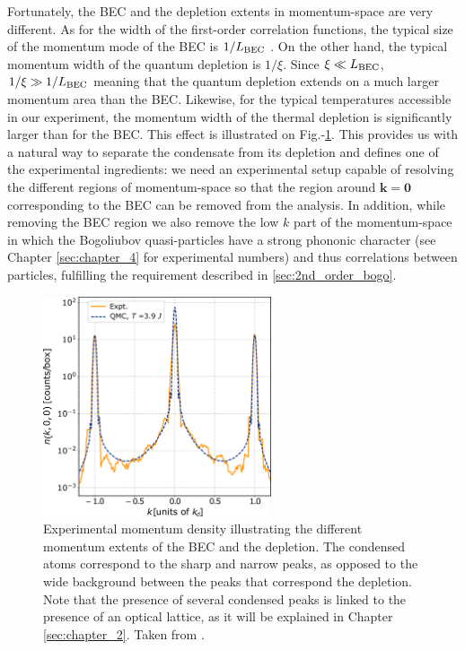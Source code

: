 Fortunately, the BEC and the depletion extents in momentum-space are very different. As for the width of the first-order correlation functions, the typical size of the momentum mode of the BEC is $1/L_{\rm{BEC}}$ \cite{stenger1999}. On the other hand, the typical momentum width of the quantum depletion is $1/\xi$. Since $\xi \ll L_{\rm{BEC}}$, $1/\xi \gg 1/L_{\rm{BEC}}$ meaning that the quantum depletion extends on a much larger momentum area than the BEC. Likewise, for the typical temperatures accessible in our experiment, the momentum width of the thermal depletion is significantly larger than for the BEC.
This effect is illustrated on Fig.-\ref{fig:density_lattice_ch1}. This provides us with a natural way to separate the condensate from its depletion and defines one of the experimental ingredients: we need an experimental setup capable of resolving the different regions of momentum-space so that the region around $\bm{k}=\bm{0}$ corresponding to the BEC can be removed from the analysis. In addition, while removing the BEC region we also remove the low $k$ part of the momentum-space in which the Bogoliubov quasi-particles have a strong phononic character (see Chapter \ref{sec:chapter_4} for experimental numbers) and thus \kmk correlations between particles, fulfilling the requirement described in \ref{sec:2nd_order_bogo}.



\begin{figure}
    \centering
    \includegraphics[width=0.6\textwidth]{Fig/Chapter1/cayla_2018.png}
    \caption[Illustration of the different momentum extents of the BEC and the depletion]{Experimental momentum density illustrating the different momentum extents of the BEC and the depletion. The condensed atoms correspond to the sharp and narrow peaks, as opposed to the wide background between the peaks that correspond the depletion. Note that the presence of several condensed peaks is linked to the presence of an optical lattice, as it will be explained in Chapter \ref{sec:chapter_2}. Taken from \cite{cayla2018single}.}
    \label{fig:density_lattice_ch1}
\end{figure}


